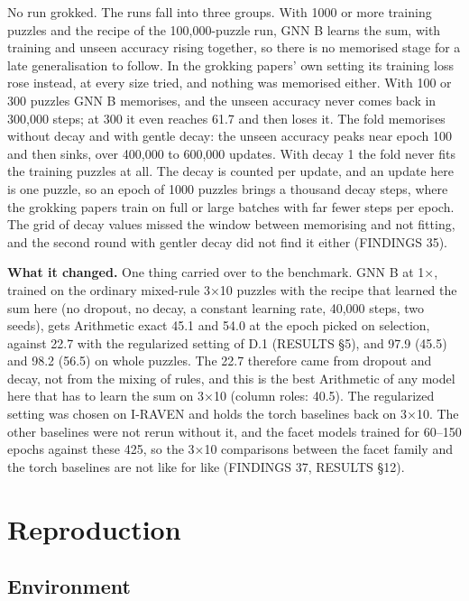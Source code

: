 No run grokked. The runs fall into three groups. With 1000 or more training puzzles and the recipe of the 100,000-puzzle run, GNN B learns the sum, with training and unseen accuracy rising together, so there is no memorised stage for a late generalisation to follow. In the grokking papers' own setting its training loss rose instead, at every size tried, and nothing was memorised either. With 100 or 300 puzzles GNN B memorises, and the unseen accuracy never comes back in 300,000 steps; at 300 it even reaches 61.7 and then loses it. The fold memorises without decay and with gentle decay: the unseen accuracy peaks near epoch 100 and then sinks, over 400,000 to 600,000 updates. With decay 1 the fold never fits the training puzzles at all. The decay is counted per update, and an update here is one puzzle, so an epoch of 1000 puzzles brings a thousand decay steps, where the grokking papers train on full or large batches with far fewer steps per epoch. The grid of decay values missed the window between memorising and not fitting, and the second round with gentler decay did not find it either (FINDINGS 35).

\textbf{What it changed.} One thing carried over to the benchmark. GNN B at 1×, trained on the ordinary mixed-rule 3×10 puzzles with the recipe that learned the sum here (no dropout, no decay, a constant learning rate, 40,000 steps, two seeds), gets Arithmetic exact 45.1 and 54.0 at the epoch picked on selection, against 22.7 with the regularized setting of D.1 (RESULTS \S{}5), and 97.9 (45.5) and 98.2 (56.5) on whole puzzles. The 22.7 therefore came from dropout and decay, not from the mixing of rules, and this is the best Arithmetic of any model here that has to learn the sum on 3×10 (column roles: 40.5). The regularized setting was chosen on I-RAVEN and holds the torch baselines back on 3×10. The other baselines were not rerun without it, and the facet models trained for 60–150 epochs against these 425, so the 3×10 comparisons between the facet family and the torch baselines are not like for like (FINDINGS 37, RESULTS \S{}12).

\chapter{Reproduction}\label{app:F}

\section{Environment}\label{sec:F.1}

